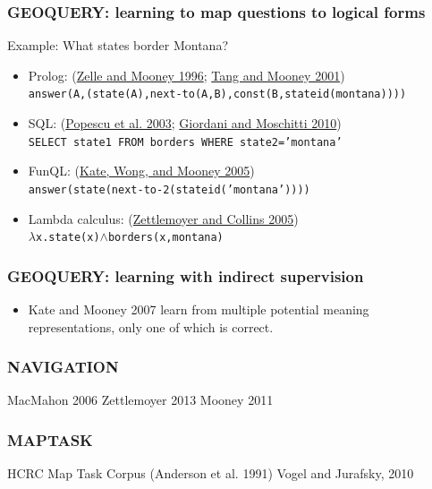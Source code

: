 \documentclass[ignorenonframetext]{beamer}
\begin{document}
\begin{frame}\frametitle{GEOQUERY: learning to map questions to logical forms}
Example: What states border Montana?
\begin{itemize}
\item Prolog:
(\href{http://aaaipress.org/Papers/AAAI/1996/AAAI96-156.pdf}{Zelle and Mooney 1996}; 
 \href{}{Tang and Mooney 2001})
\\ {\tt \small answer(A,(state(A),next-to(A,B),const(B,stateid(montana))))}
\item SQL:
(\href{http://homes.cs.washington.edu/~etzioni/papers/nli-iui03.pdf}{Popescu et al. 2003};
 \href{https://forum.disi.unitn.it/~moschitt/articles/NLDB09.pdf}{Giordani and Moschitti 2010})
\\ {\tt SELECT state1 FROM borders WHERE state2='montana'}
\item FunQL: 
(\href{}{Kate, Wong, and Mooney 2005})
\\ {\tt answer(state(next-to-2(stateid('montana'))))}
\item Lambda calculus: 
(\href{}{Zettlemoyer and Collins 2005})
\\ {\tt $\lambda$x.state(x)$\land$borders(x,montana)}
\end{itemize}
\end{frame}

\begin{frame}\frametitle{GEOQUERY: learning with indirect supervision}
\begin{itemize}
\item Kate and Mooney 2007 learn from multiple potential meaning representations, only one of which is correct.
\end{itemize}
\end{frame}

\begin{frame}\frametitle{NAVIGATION}
MacMahon 2006
Zettlemoyer 2013
Mooney 2011
\end{frame}

\begin{frame}\frametitle{MAPTASK}
HCRC Map Task Corpus (Anderson et al. 1991)
Vogel and Jurafsky, 2010

\end{frame}
\end{document}
